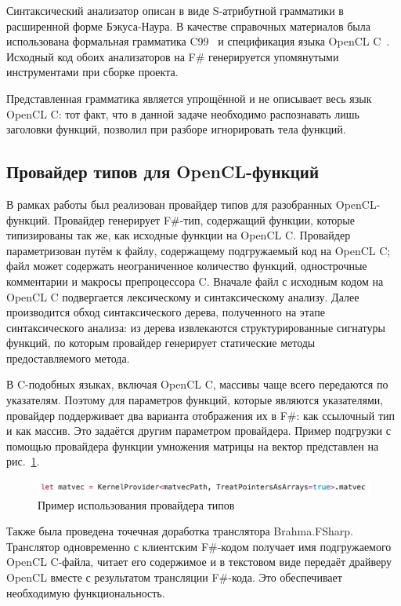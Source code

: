 Синтаксический анализатор описан в виде S-атрибутной грамматики в расширенной форме Бэкуса-Наура. В качестве справочных материалов была использована формальная грамматика C99~\cite{C99} и спецификация языка OpenCL C~\cite{OpenCL_C}. Исходный код обоих анализаторов на F\# генерируется упомянутыми инструментами при сборке проекта.

Представленная грамматика является упрощённой и не описывает весь язык OpenCL C: тот факт, что в данной задаче необходимо распознавать лишь заголовки функций, позволил при разборе игнорировать тела функций.

\subsection{Провайдер типов для OpenCL-функций}
В рамках работы был реализован провайдер типов для разобранных OpenCL-функций. Провайдер генерирует F\#-тип, содержащий функции, которые типизированы так же, как исходные функции на OpenCL C. Провайдер параметризован путём к файлу, содержащему подгружаемый код на OpenCL C; файл может содержать неограниченное количество функций, однострочные комментарии и макросы препроцессора C. Вначале файл с исходным кодом на OpenCL C подвергается лексическому и синтаксическому анализу. Далее производится обход синтаксического дерева, полученного на этапе синтаксического анализа: из дерева извлекаются структурированные сигнатуры функций, по которым провайдер генерирует статические методы предоставляемого метода.

В C-подобных языках, включая OpenCL C, массивы чаще всего передаются по указателям. Поэтому для параметров функций, которые являются указателями, провайдер поддерживает два варианта отображения их в F\#: как ссылочный тип и как массив. Это задаётся другим параметром провайдера. Пример подгрузки с помощью провайдера функции умножения матрицы на вектор представлен на рис.~\ref{tp_call_example}.

\begin{figure}[h]
\centering
\includegraphics[width=\textwidth]{Smirenko/courseworkpictures/tp-call.png}
\caption{Пример использования провайдера типов}
\label{tp_call_example}
\end{figure}

Также была проведена точечная доработка транслятора Brahma.FSharp. Транслятор одновременно с клиентским F\#-кодом получает имя подгружаемого OpenCL C-файла, читает его содержимое и в текстовом виде передаёт драйверу OpenCL вместе с результатом трансляции F\#-кода. Это обеспечивает необходимую функциональность.

